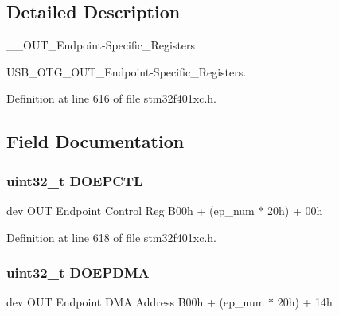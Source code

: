 \subsection{Detailed Description}
\+\_\+\+\_\+\+O\+U\+T\+\_\+\+Endpoint-\/\+Specific\+\_\+\+Registers 

U\+S\+B\+\_\+\+O\+T\+G\+\_\+\+O\+U\+T\+\_\+\+Endpoint-\/\+Specific\+\_\+\+Registers. 

Definition at line 616 of file stm32f401xc.\+h.



\subsection{Field Documentation}
\subsubsection[{\texorpdfstring{D\+O\+E\+P\+C\+TL}{DOEPCTL}}]{ uint32\+\_\+t D\+O\+E\+P\+C\+TL}\hypertarget{struct_u_s_b___o_t_g___o_u_t_endpoint_type_def_a905a2b4ece4882eb67c710e0db10e960}{}\label{struct_u_s_b___o_t_g___o_u_t_endpoint_type_def_a905a2b4ece4882eb67c710e0db10e960}
dev O\+UT Endpoint Control Reg B00h + (ep\+\_\+num $\ast$ 20h) + 00h 

Definition at line 618 of file stm32f401xc.\+h.

\subsubsection[{\texorpdfstring{D\+O\+E\+P\+D\+MA}{DOEPDMA}}]{ uint32\+\_\+t D\+O\+E\+P\+D\+MA}\hypertarget{struct_u_s_b___o_t_g___o_u_t_endpoint_type_def_a78a4f036f29e552acad6a442fbb69420}{}\label{struct_u_s_b___o_t_g___o_u_t_endpoint_type_def_a78a4f036f29e552acad6a442fbb69420}
dev O\+UT Endpoint D\+MA Address B00h + (ep\+\_\+num $\ast$ 20h) + 14h 


